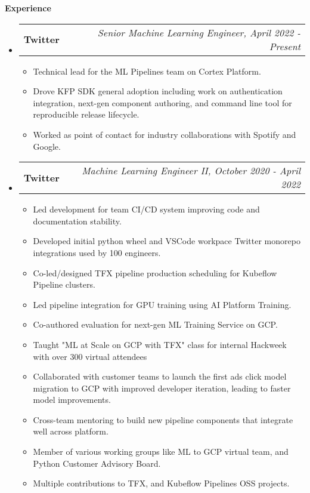 \documentclass[letterpaper,10pt]{article}
\makeatletter
\newcommand{\resitem}[1]{\item #1 \vspace{-2pt}}
\newcommand{\resheading}[1]{{\large \colorbox{mygrey}{\begin{minipage}{\textwidth}{\textbf{#1 \vphantom{p\^{E}}}}\end{minipage}}}}
\newcommand{\ressubheading}[4]{
\begin{tabular*}{7.0in}{l@{\extracolsep{\fill}}r}
		\textbf{#1} & \textit{#4} \\
\end{tabular*}\vspace{-6pt}}
\makeatother
\begin{document}
\resheading{Experience}
	\begin{itemize}
		\item
			\ressubheading{Twitter}{Boulder, CO}{Senior Machine Learning Engineer}{Senior Machine Learning Engineer, April 2022 - Present}
			\begin{itemize}
				\resitem{Technical lead for the ML Pipelines team on Cortex Platform.} 

				\resitem{Drove KFP SDK general adoption including work on authentication integration, next-gen component authoring, and command line tool for reproducible release lifecycle.}
				\resitem{Worked as point of contact for industry collaborations with Spotify and Google.}
			\end{itemize}
		\item
			\ressubheading{Twitter}{Boulder, CO}{Machine Learning Engineer II}{Machine Learning Engineer II, October 2020 - April 2022}
			\begin{itemize}
				\resitem{Led development for team CI/CD system improving code and documentation stability. } 

				\resitem{Developed initial python wheel and VSCode workpace Twitter monorepo integrations used by 100 engineers.}
				\resitem{Co-led/designed TFX pipeline production scheduling for Kubeflow Pipeline clusters.}
				\resitem{Led pipeline integration for GPU training using AI Platform Training.}
				\resitem{Co-authored evaluation for next-gen ML Training Service on GCP.}
				\resitem{Taught "ML at Scale on GCP with TFX" class for internal Hackweek with over 300 virtual attendees}
				\resitem{Collaborated with customer teams to launch the first ads click model migration to GCP with improved developer iteration, leading to faster model improvements.}
			    \resitem{Cross-team mentoring to build new pipeline components that integrate well across platform.}
				\resitem{Member of various working groups like ML to GCP virtual team, and Python Customer Advisory Board.}
				\resitem{Multiple contributions to TFX, and Kubeflow Pipelines OSS projects.}


\end{itemize}
\end{itemize}
\end{document}
